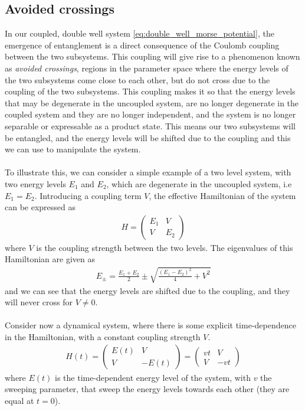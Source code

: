 \documentclass{subfiles}
\begin{document}
\subsection{Avoided crossings}\label{sec:avoided_crossings}
In our coupled, double well system \eqref{eq:double_well_morse_potential}, the emergence of entanglement is a direct consequence of the Coulomb coupling between the two subsystems. This coupling will give rise to a phenomenon known as \emph{avoided crossings}\cite{nazir2005anticrossings}, regions in the parameter space where the energy levels of the two subsystems come close to each other, but do not cross due to the coupling of the two subsystems. This coupling makes it so that the energy levels that may be degenerate in the uncoupled system, are no longer degenerate in the coupled system and they are no longer independent, and the system is no longer separable or expressable as a product state. This means our two subsystems will be entangled, and the energy levels will be shifted due to the coupling and this we can use to manipulate the system. \\ \\
To illustrate this, we can consider a simple example of a two level system, with two energy levels $E_1$ and $E_2$, which are degenerate in the uncoupled system, i.e $E_1 = E_2$. Introducing a coupling term $V$, the effective Hamiltonian of the system can be expressed as
\begin{align*}
    H = \begin{pmatrix}
        E_1 & V \\
        V & E_2
    \end{pmatrix}
\end{align*}
where $V$ is the coupling strength between the two levels. The eigenvalues of this Hamiltonian are given as
\begin{align*}
    E_\pm = \frac{E_1 + E_2}{2} \pm \sqrt{\frac{(E_1 - E_2)^2}{4} + V^2}
\end{align*}
and we can see that the energy levels are shifted due to the coupling, and they will never cross for $V\neq0$. \\ \\

Consider now a dynamical system, where there is some explicit time-dependence in the Hamiltonian, with a constant coupling strength $V$.
\begin{align}
    H(t) = \begin{pmatrix}
        E(t) & V \\
        V & -E(t)
    \end{pmatrix} = \begin{pmatrix}
        vt & V \\
        V & -vt
    \end{pmatrix} \label{eq:landau_zener}
\end{align}
where $E(t)$ is the time-dependent energy level of the system, with $v$ the sweeping parameter, that sweep the energy levels towards each other (they are equal at $t=0$). 
\end{document}
